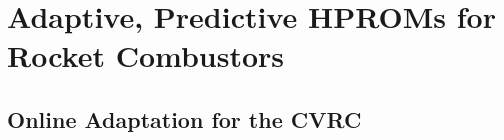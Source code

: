 \chapter{Adaptive, Predictive HPROMs for Rocket Combustors}
\label{chap:AdaptiveResults}


\section{Online Adaptation for the CVRC}

